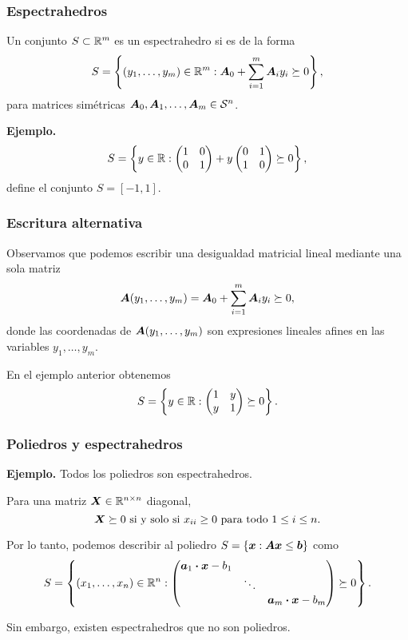 \documentclass[aspectratio=169,12pt,spanish]{beamer}
\begin{document}

\begin{frame}
\frametitle{Espectrahedros}

\begin{definition}
Un conjunto $S \subset \mathbb{R}^m$ es un espectrahedro si es de  la forma
$$
S = \left\{ (y_1, \dots, y_m) \in \mathbb{R}^m : \bm{A}_0 + \sum_{i = 1}^m \bm{A}_i y_i \succeq 0\right\},
$$
para matrices simétricas $\bm{A}_0, \bm{A}_1, \dots, \bm{A}_m \in {\mathcal S}^n$.
\end{definition}

\textbf{Ejemplo.}
$$
S = \left\{ y \in \mathbb{R} : \begin{pmatrix} 1 & 0 \\ 0 & 1 \end{pmatrix} + y \begin{pmatrix} 0 & 1 \\ 1 & 0 \end{pmatrix} \succeq 0\right\},
$$
define el conjunto \pause $S = [-1, 1]$.

\end{frame}


\begin{frame}
\frametitle{Escritura alternativa}

Observamos que podemos escribir una desigualdad matricial lineal mediante una sola matriz
$$\bm{A}(y_1, \dots, y_m) = \bm{A}_0 + \sum_{i = 1}^m \bm{A}_i y_i \succeq 0,$$
donde las coordenadas de $\bm{A}(y_1, \dots, y_m)$ son expresiones lineales afines en las variables $y_1, \dots, y_m$.

En el ejemplo anterior obtenemos
$$
S = \left\{ y \in \mathbb{R} : \begin{pmatrix} 1 & y \\ y & 1 \end{pmatrix} \succeq 0\right\}.
$$


\end{frame}


\begin{frame}
\frametitle{Poliedros y espectrahedros}

\textbf{Ejemplo.}
Todos los poliedros son espectrahedros.

Para una matriz $\bm{X} \in \mathbb{R}^{n\times n}$ diagonal,
$$\bm{X} \succeq 0 \text{ si y solo si } x_{ii} \ge 0 \text{ para todo } 1 \le i \le n.$$

Por lo tanto, podemos describir al poliedro $S = \{\bm{x}: \bm{A} \bm{x} \le \bm{b}\}$ como \pause
$$
S = \left\{ (x_1, \dots, x_n) \in \mathbb{R}^n :
\begin{pmatrix} \bm{a}_1 \boldsymbol{\cdot} \bm{x} - b_1 & & \\ & \ddots & \\ & & \bm{a}_m \boldsymbol{\cdot} \bm{x} - b_m \end{pmatrix} \succeq 0
\right\}.
$$

Sin embargo, existen espectrahedros que no son poliedros.


\end{frame}
\end{document}
